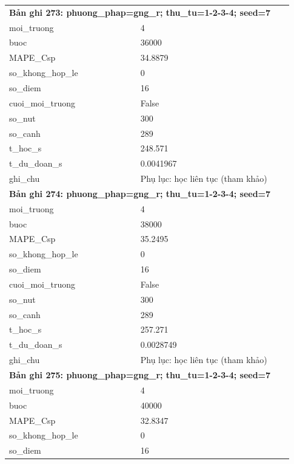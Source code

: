 \begin{longtable}{p{0.43\linewidth}p{0.50\linewidth}}
\midrule
\multicolumn{2}{p{0.95\linewidth}}{\textbf{Bản ghi 273: phuong\_phap=gng\_r; thu\_tu=1-2-3-4; seed=7}} \\
moi\_\allowbreak truong & 4 \\
buoc & 36000 \\
MAPE\_\allowbreak Csp & 34.8879 \\
so\_\allowbreak khong\_\allowbreak hop\_\allowbreak le & 0 \\
so\_\allowbreak diem & 16 \\
cuoi\_\allowbreak moi\_\allowbreak truong & False \\
so\_\allowbreak nut & 300 \\
so\_\allowbreak canh & 289 \\
t\_\allowbreak hoc\_\allowbreak s & 248.571 \\
t\_\allowbreak du\_\allowbreak doan\_\allowbreak s & 0.0041967 \\
ghi\_\allowbreak chu & Phụ lục: học liên tục (tham khảo) \\
\midrule
\multicolumn{2}{p{0.95\linewidth}}{\textbf{Bản ghi 274: phuong\_phap=gng\_r; thu\_tu=1-2-3-4; seed=7}} \\
moi\_\allowbreak truong & 4 \\
buoc & 38000 \\
MAPE\_\allowbreak Csp & 35.2495 \\
so\_\allowbreak khong\_\allowbreak hop\_\allowbreak le & 0 \\
so\_\allowbreak diem & 16 \\
cuoi\_\allowbreak moi\_\allowbreak truong & False \\
so\_\allowbreak nut & 300 \\
so\_\allowbreak canh & 289 \\
t\_\allowbreak hoc\_\allowbreak s & 257.271 \\
t\_\allowbreak du\_\allowbreak doan\_\allowbreak s & 0.0028749 \\
ghi\_\allowbreak chu & Phụ lục: học liên tục (tham khảo) \\
\midrule
\multicolumn{2}{p{0.95\linewidth}}{\textbf{Bản ghi 275: phuong\_phap=gng\_r; thu\_tu=1-2-3-4; seed=7}} \\
moi\_\allowbreak truong & 4 \\
buoc & 40000 \\
MAPE\_\allowbreak Csp & 32.8347 \\
so\_\allowbreak khong\_\allowbreak hop\_\allowbreak le & 0 \\
so\_\allowbreak diem & 16 \\

\end{longtable}
